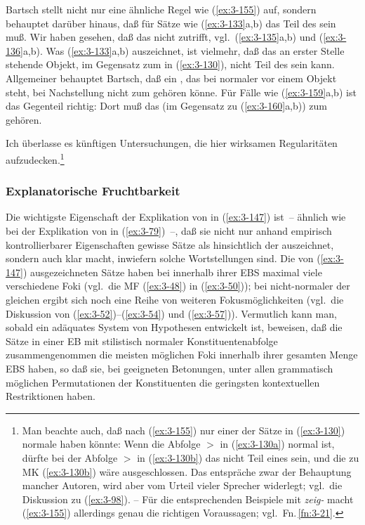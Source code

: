 \documentclass[output=paper]{langsci/langscibook}
\begin{document}
Bartsch stellt nicht nur eine ähnliche Regel wie (\ref{ex:3-155}) auf, sondern behauptet \citep[523]{Bartsch76} darüber hinaus, daß für Sätze wie (\ref{ex:3-133}a,b) das  Teil des  sein muß. Wir haben gesehen, daß das nicht zutrifft, vgl.\ (\ref{ex:3-135}a,b) und (\ref{ex:3-136}a,b). Was (\ref{ex:3-133}a,b) auszeichnet, ist vielmehr, daß das an erster Stelle stehende Objekt,
im Gegensatz zum  in (\ref{ex:3-130}), nicht Teil des  sein
kann. Allgemeiner behauptet Bartsch, daß ein , das bei normaler
 vor einem Objekt steht, bei Nachstellung nicht zum 
gehören könne. Für Fälle wie (\ref{ex:3-159}a,b) ist das Gegenteil richtig:
Dort muß das  (im Gegensatz zu (\ref{ex:3-160}a,b)) zum  gehören.
\pagebreak

Ich überlasse es künftigen Untersuchungen, die hier wirksamen
Regularitäten aufzudecken.\footnote{\label{fn:3-28}%
  Man beachte auch, daß nach (\ref{ex:3-155}) nur einer der Sätze in (\ref{ex:3-130}) normale  haben könnte: Wenn die Abfolge  $>$  in (\ref{ex:3-130a}) normal ist, dürfte bei der Abfolge  $>$  in (\ref{ex:3-130b}) das  nicht Teil eines  sein, und die  zu MK
  (\ref{ex:3-130b}) wäre ausgeschlossen. Das entspräche zwar der Behauptung mancher
  Autoren, wird aber vom Urteil vieler Sprecher widerlegt; vgl.\ die Diskussion zu
  (\ref{ex:3-98}). -- Für die entsprechenden Beispiele mit \textit{zeig-} macht (\ref{ex:3-155})
  allerdings genau die richtigen Voraussagen; vgl.\ Fn.\,\ref{fn:3-21}.%
}

\subsubsection{Explanatorische Fruchtbarkeit}
\label{subsubsec:3-2-3-3}

Die wichtigste Eigenschaft der Explikation von  in (\ref{ex:3-147}) ist~-- ähnlich wie bei der
Explikation von  in (\ref{ex:3-79})~--, daß
sie nicht nur anhand empirisch kontrollierbarer Eigenschaften gewisse
Sätze als  hinsichtlich der  auszeichnet,
sondern auch klar macht, inwiefern solche Wortstellungen
 sind. Die von (\ref{ex:3-147}) ausgezeichneten Sätze haben bei
 innerhalb ihrer EBS maximal viele verschiedene Foki
(vgl.\ die MF (\ref{ex:3-48}) in (\ref{ex:3-50})); bei nicht-normaler  der gleichen
 ergibt sich noch eine Reihe von weiteren
Fokusmöglichkeiten (vgl.\ die Diskussion von (\ref{ex:3-52})--(\ref{ex:3-54}) und
(\ref{ex:3-57})). Vermutlich kann man, sobald ein adäquates System von Hypothesen
entwickelt ist, beweisen, daß die Sätze in einer EB mit
stilistisch normaler Konstituentenabfolge zusammengenommen die meisten
möglichen Foki innerhalb ihrer gesamten Menge EBS haben, so daß
sie, bei geeigneten Betonungen, unter allen grammatisch möglichen
Permutationen der Konstituenten die geringsten kontextuellen
Restriktionen haben.
\end{document}
